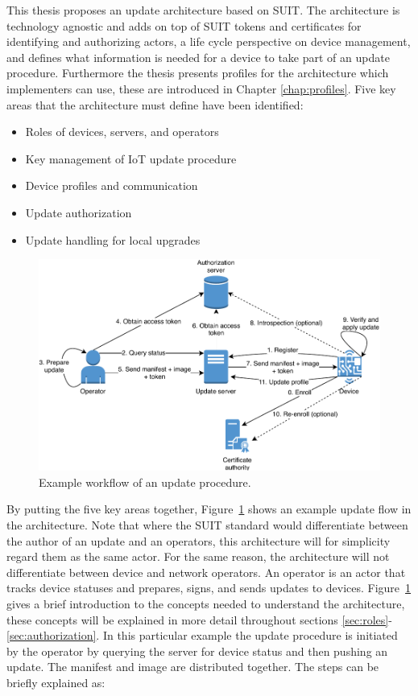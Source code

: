\documentclass[0-thesis.tex]{subfiles}
\begin{document}
This thesis proposes an update architecture based on SUIT. The architecture is technology
agnostic and adds on top of SUIT tokens and certificates for identifying and authorizing
actors, a life cycle perspective on device management, and defines what information is
needed for a device to take part of an update procedure. Furthermore the thesis presents
profiles for the architecture which implementers can use, these are introduced in Chapter
\ref{chap:profiles}. Five key areas that the architecture must define have been
identified:

\begin{itemize}
    \item Roles of devices, servers, and operators
    \item Key management of IoT update procedure
    \item Device profiles and communication
    \item Update authorization
    \item Update handling for local upgrades
\end{itemize}

\begin{figure}
    \caption{Example workflow of an update procedure.}
    \label{fig:communication-workflow}
    \includegraphics{images/update-flow.pdf}
\end{figure}

By putting the five key areas together, Figure~\ref{fig:communication-workflow} shows an
example update flow in the architecture. Note that where the SUIT standard would
differentiate between the author of an update and an operators, this architecture will for
simplicity regard them as the same actor. For the same reason, the architecture will not
differentiate between device and network operators. An operator is an actor that tracks
device statuses and prepares, signs, and sends updates to devices.
Figure~\ref{fig:communication-workflow} gives a brief introduction to the concepts needed
to understand the architecture, these concepts will be explained in more detail throughout
sections \ref{sec:roles}-\ref{sec:authorization}. In this particular example the update
procedure is initiated by the operator by querying the server for device status and then
pushing an update. The manifest and image are distributed together. The steps can be
briefly explained as:
\end{document}
